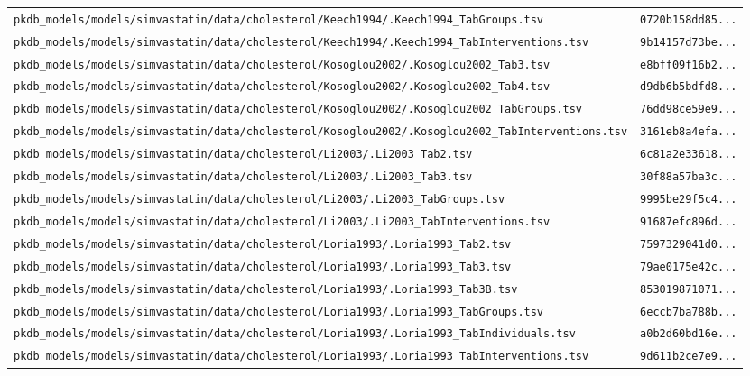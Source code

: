 \documentclass{article}
\begin{document}
\begin{longtable}{ll}
\texttt{pkdb\_models/models/simvastatin/data/cholesterol/Keech1994/.Keech1994\_TabGroups.tsv} & \texttt{0720b158dd85...} \\
\texttt{pkdb\_models/models/simvastatin/data/cholesterol/Keech1994/.Keech1994\_TabInterventions.tsv} & \texttt{9b14157d73be...} \\
\texttt{pkdb\_models/models/simvastatin/data/cholesterol/Kosoglou2002/.Kosoglou2002\_Tab3.tsv} & \texttt{e8bff09f16b2...} \\
\texttt{pkdb\_models/models/simvastatin/data/cholesterol/Kosoglou2002/.Kosoglou2002\_Tab4.tsv} & \texttt{d9db6b5bdfd8...} \\
\texttt{pkdb\_models/models/simvastatin/data/cholesterol/Kosoglou2002/.Kosoglou2002\_TabGroups.tsv} & \texttt{76dd98ce59e9...} \\
\texttt{pkdb\_models/models/simvastatin/data/cholesterol/Kosoglou2002/.Kosoglou2002\_TabInterventions.tsv} & \texttt{3161eb8a4efa...} \\
\texttt{pkdb\_models/models/simvastatin/data/cholesterol/Li2003/.Li2003\_Tab2.tsv} & \texttt{6c81a2e33618...} \\
\texttt{pkdb\_models/models/simvastatin/data/cholesterol/Li2003/.Li2003\_Tab3.tsv} & \texttt{30f88a57ba3c...} \\
\texttt{pkdb\_models/models/simvastatin/data/cholesterol/Li2003/.Li2003\_TabGroups.tsv} & \texttt{9995be29f5c4...} \\
\texttt{pkdb\_models/models/simvastatin/data/cholesterol/Li2003/.Li2003\_TabInterventions.tsv} & \texttt{91687efc896d...} \\
\texttt{pkdb\_models/models/simvastatin/data/cholesterol/Loria1993/.Loria1993\_Tab2.tsv} & \texttt{7597329041d0...} \\
\texttt{pkdb\_models/models/simvastatin/data/cholesterol/Loria1993/.Loria1993\_Tab3.tsv} & \texttt{79ae0175e42c...} \\
\texttt{pkdb\_models/models/simvastatin/data/cholesterol/Loria1993/.Loria1993\_Tab3B.tsv} & \texttt{853019871071...} \\
\texttt{pkdb\_models/models/simvastatin/data/cholesterol/Loria1993/.Loria1993\_TabGroups.tsv} & \texttt{6eccb7ba788b...} \\
\texttt{pkdb\_models/models/simvastatin/data/cholesterol/Loria1993/.Loria1993\_TabIndividuals.tsv} & \texttt{a0b2d60bd16e...} \\
\texttt{pkdb\_models/models/simvastatin/data/cholesterol/Loria1993/.Loria1993\_TabInterventions.tsv} & \texttt{9d611b2ce7e9...} \\

\end{longtable}
\end{document}
